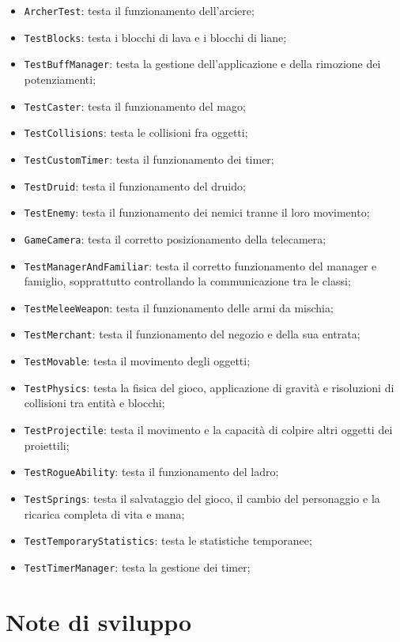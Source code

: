 \documentclass[a4paper,12pt]{report}
\begin{document}
\begin{itemize}
    \item \texttt{ArcherTest}: testa il funzionamento dell'arciere;
    \item \texttt{TestBlocks}: testa i blocchi di lava e i blocchi di liane;
    \item \texttt{TestBuffManager}: testa la gestione dell'applicazione e della rimozione dei potenziamenti;
    \item \texttt{TestCaster}: testa il funzionamento del mago;
    \item \texttt{TestCollisions}: testa le collisioni fra oggetti;
    \item \texttt{TestCustomTimer}: testa il funzionamento dei timer;
    \item \texttt{TestDruid}: testa il funzionamento del druido;
    \item \texttt{TestEnemy}: testa il funzionamento dei nemici tranne il loro movimento;
    \item \texttt{GameCamera}: testa il corretto posizionamento della telecamera;
    \item \texttt{TestManagerAndFamiliar}: testa il corretto funzionamento del manager e famiglio, sopprattutto controllando la communicazione tra le classi;
    \item \texttt{TestMeleeWeapon}: testa il funzionamento delle armi da mischia;
    \item \texttt{TestMerchant}: testa il funzionamento del negozio e della sua entrata;
    \item \texttt{TestMovable}: testa il movimento degli oggetti;
    \item \texttt{TestPhysics}: testa la fisica del gioco, applicazione di gravità e risoluzioni di collisioni tra entità e blocchi;
    \item \texttt{TestProjectile}: testa il movimento e la capacità di colpire altri oggetti dei proiettili;
    \item \texttt{TestRogueAbility}: testa il funzionamento del ladro;
    \item \texttt{TestSprings}: testa il salvataggio del gioco, il cambio del personaggio e la ricarica completa di vita e mana;
    \item \texttt{TestTemporaryStatistics}: testa le statistiche temporanee;
    \item \texttt{TestTimerManager}: testa la gestione dei timer;
\end{itemize}

\section{Note di sviluppo}
\end{document}
